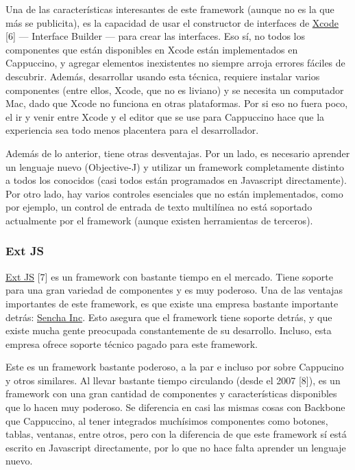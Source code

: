 \documentclass[12pt,titlepage,]{article}
\begin{document}
Una de las características interesantes de este framework (aunque no es
la que más se publicita), es la capacidad de usar el constructor de
interfaces de \href{https://developer.apple.com/xcode/}{Xcode} {[}6{]}
--- Interface Builder --- para crear las interfaces. Eso sí, no todos
los componentes que están disponibles en Xcode están implementados en
Cappuccino, y agregar elementos inexistentes no siempre arroja errores
fáciles de descubrir. Además, desarrollar usando esta técnica, requiere
instalar varios componentes (entre ellos, Xcode, que no es liviano) y se
necesita un computador Mac, dado que Xcode no funciona en otras
plataformas. Por si eso no fuera poco, el ir y venir entre Xcode y el
editor que se use para Cappuccino hace que la experiencia sea todo menos
placentera para el desarrollador.

Además de lo anterior, tiene otras desventajas. Por un lado, es
necesario aprender un lenguaje nuevo (Objective-J) y utilizar un
framework completamente distinto a todos los conocidos (casi todos están
programados en Javascript directamente). Por otro lado, hay varios
controles esenciales que no están implementados, como por ejemplo, un
control de entrada de texto multilínea no está soportado actualmente por
el framework (aunque existen herramientas de terceros).

\subsubsection{Ext JS}

\href{http://www.sencha.com/products/extjs/}{Ext JS} {[}7{]} es un
framework con bastante tiempo en el mercado. Tiene soporte para una gran
variedad de componentes y es muy poderoso. Una de las ventajas
importantes de este framework, es que existe una empresa bastante
importante detrás: \href{http://www.sencha.com/}{Sencha Inc}. Esto
asegura que el framework tiene soporte detrás, y que existe mucha gente
preocupada constantemente de su desarrollo. Incluso, esta empresa ofrece
soporte técnico pagado para este framework.

Este es un framework bastante poderoso, a la par e incluso por sobre
Cappucino y otros similares. Al llevar bastante tiempo circulando (desde
el 2007 {[}8{]}), es un framework con una gran cantidad de componentes y
características disponibles que lo hacen muy poderoso. Se diferencia en
casi las mismas cosas con Backbone que Cappuccino, al tener integrados
muchísimos componentes como botones, tablas, ventanas, entre otros, pero
con la diferencia de que este framework sí está escrito en Javascript
directamente, por lo que no hace falta aprender un lenguaje nuevo.
\end{document}
